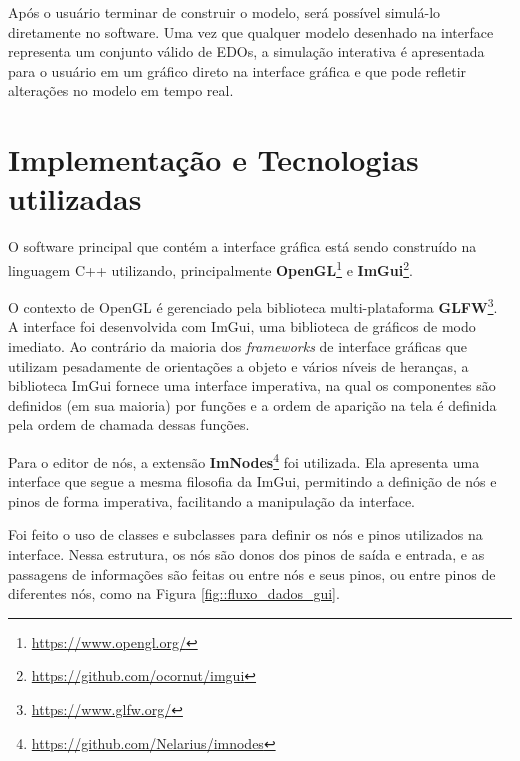 \documentclass[
	12pt,				%
	openright,			%
	oneside,			%
	a4paper,			%
	main=brazil,
	english,			%
	]{ufsj-abntex2}
\begin{document}
Após o usuário terminar de construir o modelo, será possível simulá-lo diretamente no software. Uma vez que qualquer modelo desenhado na interface representa um conjunto válido de EDOs, a simulação interativa é apresentada para o usuário em um gráfico direto na interface gráfica e que pode refletir alterações no modelo em tempo real. 

\section{Implementação e Tecnologias utilizadas}
\label{sec:tecnologias}


O software principal que contém a interface gráfica está sendo construído na linguagem C++ utilizando, principalmente \textbf{OpenGL}\footnote{\href{https://www.opengl.org/}{https://www.opengl.org/}} e \textbf{ImGui}\footnote{\href{https://github.com/ocornut/imgui}{https://github.com/ocornut/imgui}}.

O contexto de OpenGL é gerenciado pela biblioteca multi-plataforma \textbf{GLFW}\footnote{\href{https://www.glfw.org/}{https://www.glfw.org/}}. A interface foi desenvolvida com ImGui, uma biblioteca de gráficos de modo imediato. Ao contrário da maioria dos \textit{frameworks} de interface gráficas que utilizam pesadamente de orientações a objeto e vários níveis de heranças, a biblioteca ImGui fornece uma interface imperativa, na qual os componentes são definidos (em sua maioria) por funções e a ordem de aparição na tela é definida pela ordem de chamada dessas funções.

Para o editor de nós, a extensão \textbf{ImNodes}\footnote{\href{https://github.com/Nelarius/imnodes}{https://github.com/Nelarius/imnodes}} foi utilizada. Ela apresenta uma interface que segue a mesma filosofia da ImGui, permitindo a definição de nós e pinos de forma imperativa, facilitando a manipulação da interface.

Foi feito o uso de classes e subclasses para definir os nós e pinos utilizados na interface. Nessa estrutura, os nós são donos dos pinos de saída e entrada, e as passagens de informações são feitas ou entre nós e seus pinos, ou entre pinos de diferentes nós, como na Figura \ref{fig::fluxo_dados_gui}.
\end{document}
